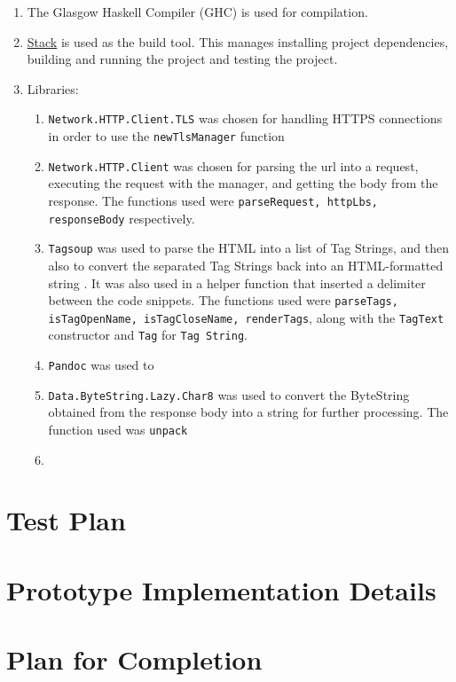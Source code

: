 \documentclass{scrreprt}
\begin{document}
\begin{enumerate}
    \item The Glasgow Haskell Compiler (GHC) is used for compilation.
    \item \href{https://docs.haskellstack.org/en/stable/}{Stack} is used as the build tool. This manages installing project dependencies, building and running the project and testing the project.
    \item Libraries:
    \begin{enumerate}
        \item \texttt{Network.HTTP.Client.TLS} was chosen for handling HTTPS connections in order to use the \texttt{newTlsManager} function
        \item \texttt{Network.HTTP.Client} was chosen for parsing the url into a request, executing the request with the manager, and getting the body from the response. The functions used were \texttt{parseRequest, httpLbs, responseBody} respectively.
        \item \texttt{Tagsoup} was used to parse the HTML into a list of Tag Strings, and then also to convert the separated Tag Strings back into an HTML-formatted string . It was also used in a helper function that inserted a delimiter between the code snippets. The functions used were \texttt{parseTags, isTagOpenName, isTagCloseName, renderTags}, along with the \texttt{TagText} constructor and \texttt{Tag} for \texttt{Tag String}.
        \item \texttt{Pandoc} was used to 
        






        \item \texttt{Data.ByteString.Lazy.Char8} was used to convert the ByteString obtained from the response body into a string for further processing. The function used was \texttt{unpack}
        \item 
    \end{enumerate} 
\end{enumerate}






\chapter{Test Plan}




\chapter{Prototype Implementation Details}




\chapter{Plan for Completion}
\end{document}
